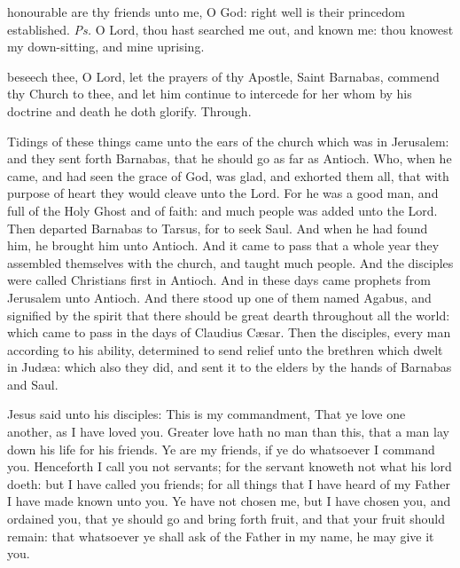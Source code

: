 \introit
{} honourable are thy friends unto me, O God: right well is their princedom established. \textit{Ps.} O Lord, thou hast searched me out, and known me: thou knowest my down-sitting, and mine uprising.

\collect
{} beseech thee, O Lord, let the prayers of thy Apostle, Saint Barnabas, commend thy Church to thee, and let him continue to intercede for her whom by his doctrine and death he doth glorify. Through.

 Tidings of these things came unto the ears of the church which was in Jerusalem: and they sent forth Barnabas, that he should go as far as Antioch. Who, when he came, and had seen the grace of God, was glad, and exhorted them all, that with purpose of heart they would cleave unto the Lord. For he was a good man, and full of the Holy Ghost and of faith: and much people was added unto the Lord. Then departed Barnabas to Tarsus, for to seek Saul. And when he had found him, he brought him unto Antioch. And it came to pass that a whole year they assembled themselves with the church, and taught much people. And the disciples were called Christians first in Antioch. And in these days came prophets from Jerusalem unto Antioch. And there stood up one of them named Agabus, and signified by the spirit that there should be great dearth throughout all the world: which came to pass in the days of Claudius C{\ae}sar. Then the disciples, every man according to his ability, determined to send relief unto the brethren which dwelt in Jud{\ae}a: which also they did, and sent it to the elders by the hands of Barnabas and Saul.\\



\clearpage
\alleluianotice


 Jesus said unto his disciples: This is my commandment, That ye love one another, as I have loved you. Greater love hath no man than this, that a man lay down his life for his friends. Ye are my friends, if ye do whatsoever I command you. Henceforth I call you not servants; for the servant knoweth not what his lord doeth: but I have called you friends; for all things that I have heard of my Father I have made known unto you. Ye have not chosen me, but I have chosen you, and ordained you, that ye should go and bring forth fruit, and that your fruit should remain: that whatsoever ye shall ask of the Father in my name, he may give it you.

